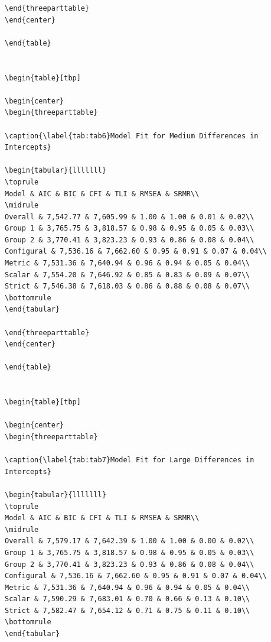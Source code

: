 \documentclass[
  man]{apa6}
\begin{document}
\begin{verbatim}
\end{threeparttable}
\end{center}

\end{table}


\begin{table}[tbp]

\begin{center}
\begin{threeparttable}

\caption{\label{tab:tab6}Model Fit for Medium Differences in Intercepts}

\begin{tabular}{lllllll}
\toprule
Model & AIC & BIC & CFI & TLI & RMSEA & SRMR\\
\midrule
Overall & 7,542.77 & 7,605.99 & 1.00 & 1.00 & 0.01 & 0.02\\
Group 1 & 3,765.75 & 3,818.57 & 0.98 & 0.95 & 0.05 & 0.03\\
Group 2 & 3,770.41 & 3,823.23 & 0.93 & 0.86 & 0.08 & 0.04\\
Configural & 7,536.16 & 7,662.60 & 0.95 & 0.91 & 0.07 & 0.04\\
Metric & 7,531.36 & 7,640.94 & 0.96 & 0.94 & 0.05 & 0.04\\
Scalar & 7,554.20 & 7,646.92 & 0.85 & 0.83 & 0.09 & 0.07\\
Strict & 7,546.38 & 7,618.03 & 0.86 & 0.88 & 0.08 & 0.07\\
\bottomrule
\end{tabular}

\end{threeparttable}
\end{center}

\end{table}


\begin{table}[tbp]

\begin{center}
\begin{threeparttable}

\caption{\label{tab:tab7}Model Fit for Large Differences in Intercepts}

\begin{tabular}{lllllll}
\toprule
Model & AIC & BIC & CFI & TLI & RMSEA & SRMR\\
\midrule
Overall & 7,579.17 & 7,642.39 & 1.00 & 1.00 & 0.00 & 0.02\\
Group 1 & 3,765.75 & 3,818.57 & 0.98 & 0.95 & 0.05 & 0.03\\
Group 2 & 3,770.41 & 3,823.23 & 0.93 & 0.86 & 0.08 & 0.04\\
Configural & 7,536.16 & 7,662.60 & 0.95 & 0.91 & 0.07 & 0.04\\
Metric & 7,531.36 & 7,640.94 & 0.96 & 0.94 & 0.05 & 0.04\\
Scalar & 7,590.29 & 7,683.01 & 0.70 & 0.66 & 0.13 & 0.10\\
Strict & 7,582.47 & 7,654.12 & 0.71 & 0.75 & 0.11 & 0.10\\
\bottomrule
\end{tabular}


\end{verbatim}
\end{document}

